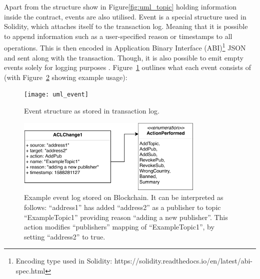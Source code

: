Apart from the structure show in Figure\ref{fig:uml_topic} holding information inside the contract, events are also utilised. Event is a special structure used in Solidity, which attaches itself to the transaction log. Meaning that it is possible to append information such as a user-specified reason or timestamps to all operations. This is then encoded in Application Binary Interface (ABI)\footnote{Encoding type used in Solidity: https://solidity.readthedocs.io/en/latest/abi-spec.html} JSON and sent along with the transaction. Though, it is also possible to emit empty events solely for logging purposes \citep{dannen2017introducing}.  Figure~\ref{fig:uml_event} outlines what each event consists of (with Figure~\ref{fig:uml_event_example} showing example usage):

\begin{figure}[h]
    \centering
    \texttt{[image: uml\_event]}
    \caption{Event structure as stored in transaction log.}
    \label{fig:uml_event}
\end{figure}
\begin{figure}[h]
    \centering
    \includegraphics[width=0.8\textwidth]{report/img/uml_event_example.pdf}
    \caption{Example event log stored on Blockchain. It can be interpreted as follows: ``address1'' has added ``address2'' as a publisher to topic ``ExampleTopic1'' providing reason ``adding a new publisher''. This action modifies ``publishers'' mapping of ``ExampleTopic1'', by setting ``address2'' to true.}
    \label{fig:uml_event_example}
\end{figure}


